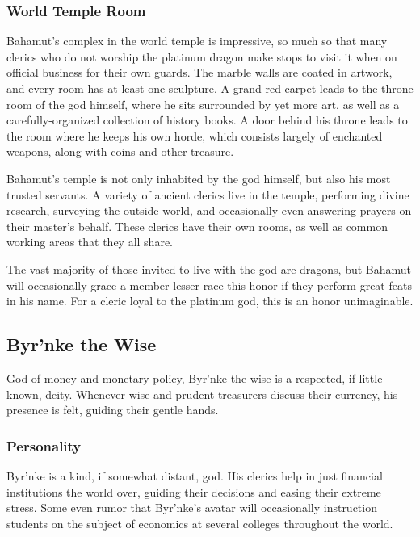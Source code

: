 \subsubsection*{World Temple Room}
Bahamut's complex in the world temple is impressive, so much so that many clerics who do not worship the platinum dragon make stops to visit it when on official business for their own guards.
The marble walls are coated in artwork, and every room has at least one sculpture.
A grand red carpet leads to the throne room of the god himself, where he sits surrounded by yet more art, as well as a carefully-organized collection of history books.
A door behind his throne leads to the room where he keeps his own horde, which consists largely of enchanted weapons, along with coins and other treasure.

Bahamut's temple is not only inhabited by the god himself, but also his most trusted servants.
A variety of ancient clerics live in the temple, performing divine research, surveying the outside world, and occasionally even answering prayers on their master's behalf.
These clerics have their own rooms, as well as common working areas that they all share.

The vast majority of those invited to live with the god are dragons, but Bahamut will occasionally grace a member lesser race this honor if they perform great feats in his name.
For a cleric loyal to the platinum god, this is an honor unimaginable.

\subsection*{Byr'nke the Wise}
\begin{goddesc}
\end{goddesc}
God of money and monetary policy, Byr'nke the wise is a respected, if little-known, deity.
Whenever wise and prudent treasurers discuss their currency, his presence is felt, guiding their gentle hands.

\subsubsection*{Personality}
Byr'nke is a kind, if somewhat distant, god.
His clerics help in just financial institutions the world over, guiding their decisions and easing their extreme stress.
Some even rumor that Byr'nke's avatar will occasionally instruction students on the subject of economics at several colleges throughout the world.

